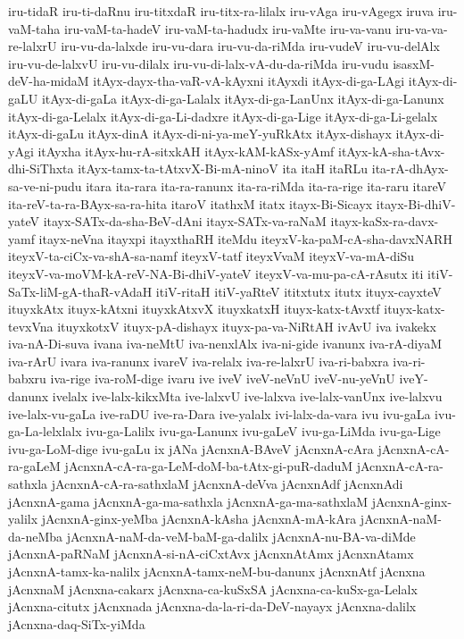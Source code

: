 {iru-tidaR
iru-ti-daRnu
iru-titxdaR
iru-titx-ra-lilalx
iru-vAga
iru-vAgegx
iruva
iru-vaM-taha
iru-vaM-ta-hadeV
iru-vaM-ta-hadudx
iru-vaMte
iru-va-vanu
iru-va-va-re-lalxrU
iru-vu-da-lalxde
iru-vu-dara
iru-vu-da-riMda
iru-vudeV
iru-vu-delAlx
iru-vu-de-lalxvU
iru-vu-dilalx
iru-vu-di-lalx-vA-du-da-riMda
iru-vudu
isasxM-deV-ha-midaM
itAyx-dayx-tha-vaR-vA-kAyxni
itAyxdi
itAyx-di-ga-LAgi
itAyx-di-gaLU
itAyx-di-gaLa
itAyx-di-ga-Lalalx
itAyx-di-ga-LanUnx
itAyx-di-ga-Lanunx
itAyx-di-ga-Lelalx
itAyx-di-ga-Li-dadxre
itAyx-di-ga-Lige
itAyx-di-ga-Li-gelalx
itAyx-di-gaLu
itAyx-dinA
itAyx-di-ni-ya-meY-yuRkAtx
itAyx-dishayx
itAyx-di-yAgi
itAyxha
itAyx-hu-rA-sitxkAH
itAyx-kAM-kASx-yAmf
itAyx-kA-sha-tAvx-dhi-SiThxta
itAyx-tamx-ta-tAtxvX-Bi-mA-ninoV
ita
itaH
itaRLu
ita-rA-dhAyx-sa-ve-ni-pudu
itara
ita-rara
ita-ra-ranunx
ita-ra-riMda
ita-ra-rige
ita-raru
itareV
ita-reV-ta-ra-BAyx-sa-ra-hita
itaroV
itathxM
itatx
itayx-Bi-Sicayx
itayx-Bi-dhiV-yateV
itayx-SATx-da-sha-BeV-dAni
itayx-SATx-va-raNaM
itayx-kaSx-ra-davx-yamf
itayx-neVna
itayxpi
itayxthaRH
iteMdu
iteyxV-ka-paM-cA-sha-davxNARH
iteyxV-ta-ciCx-va-shA-sa-namf
iteyxV-tatf
iteyxVvaM
iteyxV-va-mA-diSu
iteyxV-va-moVM-kA-reV-NA-Bi-dhiV-yateV
iteyxV-va-mu-pa-cA-rAsutx
iti
itiV-SaTx-liM-gA-thaR-vAdaH
itiV-ritaH
itiV-yaRteV
ititxtutx
itutx
ituyx-cayxteV
ituyxkAtx
ituyx-kAtxni
ituyxkAtxvX
ituyxkatxH
ituyx-katx-tAvxtf
ituyx-katx-tevxVna
ituyxkotxV
ituyx-pA-dishayx
ituyx-pa-va-NiRtAH
ivAvU
iva
ivakekx
iva-nA-Di-suva
ivana
iva-neMtU
iva-nenxlAlx
iva-ni-gide
ivanunx
iva-rA-diyaM
iva-rArU
ivara
iva-ranunx
ivareV
iva-relalx
iva-re-lalxrU
iva-ri-babxra
iva-ri-babxru
iva-rige
iva-roM-dige
ivaru
ive
iveV
iveV-neVnU
iveV-nu-yeVnU
iveY-danunx
ivelalx
ive-lalx-kikxMta
ive-lalxvU
ive-lalxva
ive-lalx-vanUnx
ive-lalxvu
ive-lalx-vu-gaLa
ive-raDU
ive-ra-Dara
ive-yalalx
ivi-lalx-da-vara
ivu
ivu-gaLa
ivu-ga-La-lelxlalx
ivu-ga-Lalilx
ivu-ga-Lanunx
ivu-gaLeV
ivu-ga-LiMda
ivu-ga-Lige
ivu-ga-LoM-dige
ivu-gaLu
ix
jANa
jAcnxnA-BAveV
jAcnxnA-cAra
jAcnxnA-cA-ra-gaLeM
jAcnxnA-cA-ra-ga-LeM-doM-ba-tAtx-gi-puR-daduM
jAcnxnA-cA-ra-sathxla
jAcnxnA-cA-ra-sathxlaM
jAcnxnA-deVva
jAcnxnAdf
jAcnxnAdi
jAcnxnA-gama
jAcnxnA-ga-ma-sathxla
jAcnxnA-ga-ma-sathxlaM
jAcnxnA-ginx-yalilx
jAcnxnA-ginx-yeMba
jAcnxnA-kAsha
jAcnxnA-mA-kAra
jAcnxnA-naM-da-neMba
jAcnxnA-naM-da-veM-baM-ga-dalilx
jAcnxnA-nu-BA-va-diMde
jAcnxnA-paRNaM
jAcnxnA-si-nA-ciCxtAvx
jAcnxnAtAmx
jAcnxnAtamx
jAcnxnA-tamx-ka-nalilx
jAcnxnA-tamx-neM-bu-danunx
jAcnxnAtf
jAcnxna
jAcnxnaM
jAcnxna-cakarx
jAcnxna-ca-kuSxSA
jAcnxna-ca-kuSx-ga-Lelalx
jAcnxna-citutx
jAcnxnada
jAcnxna-da-la-ri-da-DeV-nayayx
jAcnxna-dalilx
jAcnxna-daq-SiTx-yiMda
}
